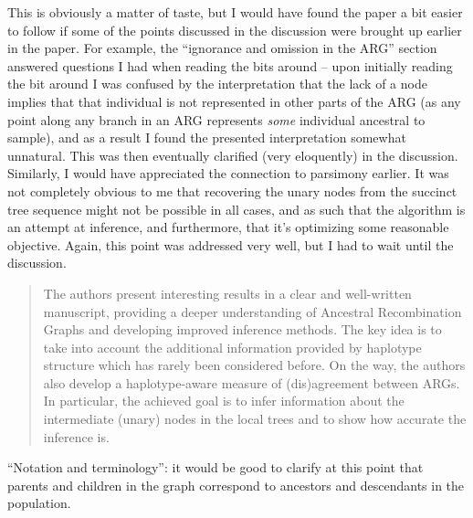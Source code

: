 \begin{point}{}
 This is obviously a matter of taste, but I would have found the paper a bit easier to follow if some of the points discussed in the discussion were brought up earlier in the paper. For example, the ``ignorance and omission in the ARG'' section 
answered questions I had when reading the bits around  -- upon initially reading the bit around 
I was confused by the interpretation that the lack of a node implies that that individual is not represented in other parts of the ARG (as any point along any branch in an ARG represents \emph{some} individual ancestral to sample), and as a result I found the presented interpretation somewhat unnatural.
This was then eventually clarified (very eloquently) in the discussion.
Similarly, I would have appreciated the connection to parsimony earlier.
It was not completely obvious to me that recovering the unary nodes from the succinct tree sequence might not be possible in all cases, and as such that the algorithm is an attempt at inference, and furthermore, that it's optimizing some reasonable objective. Again, this point was addressed very well, but I had to wait until the discussion.
\end{point}

\reply{
}





\begin{quote}
The authors present interesting results in a clear and well-written manuscript, providing a deeper understanding of Ancestral Recombination Graphs and developing improved inference methods. The key idea is to take into account the additional information provided by haplotype structure which has rarely been considered before. On the way, the authors also develop a haplotype-aware measure of (dis)agreement between ARGs. In particular, the achieved goal is to infer information about the intermediate (unary) nodes in the local trees and to show how accurate the inference is.
\end{quote}

\begin{point}{\revref} %
 ``Notation and terminology'': it would be good to clarify at this point that parents and children in the graph correspond to ancestors and descendants in the population.
\end{point}

\reply{
}

